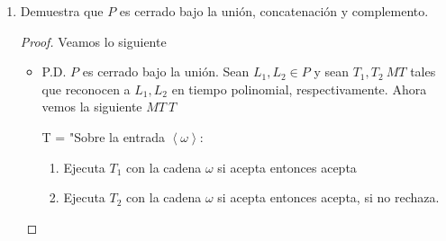 \documentclass[letterpaper]{article}
\theoremstyle{definition}
\theoremstyle{lemathm}
\theoremstyle{lemathm}
\newtheorem{sol}{Solución}
\theoremstyle{lemathm}
\theoremstyle{lemademthm}
\newcommand{\pars}[1]{\left( #1 \right) }
\newcommand{\inprod}[1]{\left\langle #1 \right\rangle }
\newcommand{\1}{\mathbbm{1}}
\begin{document}
\begin{enumerate}
\begin{enumerate}
\begin{sol}
					Por lo tanto $1274$ y $10505$ son primos relativos.

				\end{sol}
				\item $7289$ y $8029$.
				
				\begin{sol}
					Veamos que

					\begin{align*}
						mcd\pars{7289,8029} &= mcd\pars{8029, 7289 \text{ mod } 8029} &= mcd\pars{8029, 7289}\\
						&= mcd\pars{7289, 8029 \text{ mod } 7289} &= mcd\pars{7289, 740}\\
						&= mcd\pars{740, 7289 \text{ mod } 740} &= mcd\pars{740, 629}\\
						&= mcd\pars{629, 740 \text{ mod } 629} &= mcd\pars{629, 111}\\
						&= mcd\pars{111, 629 \text{ mod } 111} &= mcd\pars{111, 74}\\
						&= mcd\pars{74, 111 \text{ mod } 74} &= mcd\pars{74, 37}\\
						&= mcd\pars{37, 74 \text{ mod } 37} &= mcd\pars{37, 0}\\
						&= 37
					\end{align*}

					Por lo tanto $1274$ y $10505$ no son primos relativos.

				\end{sol}

			\end{enumerate}

			\item Demuestra que $P$ es cerrado bajo la unión, concatenación y complemento.
			
			\begin{proof}

				Veamos lo siguiente

				\begin{itemize}

					\item P.D. $P$ es cerrado bajo la unión. Sean $L_1,L_2\in P$ y sean $T_1,T_2 \ MT$ tales que reconocen a $L_1,L_2$ en tiempo polinomial, respectivamente. Ahora vemos la siguiente $MT \ T$
					
					T = "Sobre la entrada $\inprod{\omega}$:
					\begin{enumerate}
						\item Ejecuta $T_1$ con la cadena $\omega$ si acepta entonces acepta
						\item Ejecuta $T_2$ con la cadena $\omega$ si acepta entonces acepta, si no rechaza.
					\end{enumerate}


\end{itemize}
\end{proof}
\end{enumerate}
\end{document}
